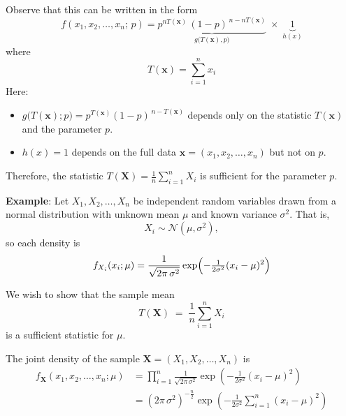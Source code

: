 \documentclass[twoside]{book}
\begin{document}
\begin{enumerate}
    Observe that this can be written in the form
    \[
    f(x_1,x_2,\dots,x_n;\,p)
    =
    \underbrace{p^{nT(\textbf{x})} \,(1-p)^{\,n - nT(\textbf{x})}}_{g\bigl(T(\textbf{x}),p\bigr)}
    \;\times\;
    \underbrace{1}_{h(x)}
    \]
    where
    \[
    T(\textbf{x}) = \sum_{i=1}^n x_i
    \]
    Here:
    \begin{itemize}
      \item \(g\bigl(T(\textbf{x});p\bigr) = p^{T(\textbf{x})} (1-p)^{\,n - T(\textbf{x})}\) depends only on the statistic \(T(\textbf{x})\) and the parameter \(p\).
      \item \(h(x) = 1\) depends on the full data \(\mathbf{x} = (x_1,x_2,\dots,x_n)\) but not on \(p\).
    \end{itemize}

    Therefore, the statistic \(T(\textbf{X})=\frac{1}{n}\sum_{i=1}^n X_i\) is sufficient for the parameter \(p\).

    \bigskip

    \textbf{Example}: Let \(X_1, X_2, \dots, X_n\) be independent random variables drawn from a normal distribution with unknown mean \(\mu\) and known variance \(\sigma^2\).  That is,
    \[
    X_i \sim \mathcal{N}(\mu,\sigma^2),
    \]
    so each density is
    \[
    f_{X_i}(x_i ; \mu)
    =
    \frac{1}{\sqrt{2\pi\,\sigma^2}}
    \exp\Bigl(-\tfrac{1}{2\sigma^2}(x_i - \mu)^2\Bigr)
    \]

    We wish to show that the sample mean
    \[
    T(\mathbf{X}) \;=\; \frac{1}{n}\sum_{i=1}^n X_i
    \]
    is a sufficient statistic for \(\mu\).

    The joint density of the sample \(\mathbf{X}=(X_1,X_2,\dots,X_n)\) is
    \[
    \begin{aligned}
    f_{\mathbf{X}}(x_1,x_2,\dots,x_n ; \mu)
    &=
    \prod_{i=1}^{n}
    \frac{1}{\sqrt{2\pi\,\sigma^2}}
    \exp\!\left( -\tfrac{1}{2\sigma^2}(x_i - \mu)^2\right) \\
    &=
    (2\pi\,\sigma^2)^{-\tfrac{n}{2}}
    \exp\!\left( -\tfrac{1}{2\sigma^2}\sum_{i=1}^n (x_i - \mu)^2\right)
    \end{aligned}
    \]


\end{enumerate}
\end{document}
